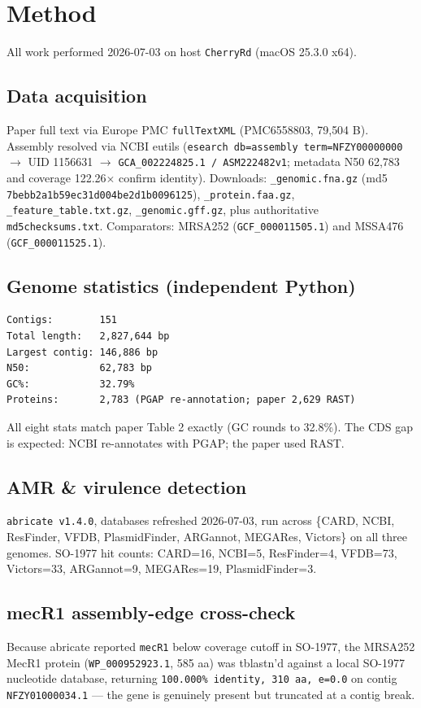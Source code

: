 \documentclass[11pt]{article}
\begin{document}
\section{Method}

All work performed 2026-07-03 on host \texttt{CherryRd} (macOS 25.3.0 x64).

\subsection{Data acquisition}
Paper full text via Europe PMC \texttt{fullTextXML} (PMC6558803, 79{,}504 B).
Assembly resolved via NCBI eutils (\texttt{esearch db=assembly term=NFZY00000000}
$\rightarrow$ UID 1156631 $\rightarrow$ \texttt{GCA\_002224825.1 / ASM222482v1};
metadata N50 62{,}783 and coverage 122.26$\times$ confirm identity). Downloads:
\texttt{\_genomic.fna.gz} (md5 \texttt{7bebb2a1b59ec31d004be2d1b0096125}),
\texttt{\_protein.faa.gz}, \texttt{\_feature\_table.txt.gz},
\texttt{\_genomic.gff.gz}, plus authoritative \texttt{md5checksums.txt}.
Comparators: MRSA252 (\texttt{GCF\_000011505.1}) and MSSA476 (\texttt{GCF\_000011525.1}).

\subsection{Genome statistics (independent Python)}
\begin{verbatim}
Contigs:        151
Total length:   2,827,644 bp
Largest contig: 146,886 bp
N50:            62,783 bp
GC%:            32.79%
Proteins:       2,783 (PGAP re-annotation; paper 2,629 RAST)
\end{verbatim}
All eight stats match paper Table 2 exactly (GC rounds to 32.8\%).
The CDS gap is expected: NCBI re-annotates with PGAP; the paper used RAST.

\subsection{AMR \& virulence detection}
\texttt{abricate v1.4.0}, databases refreshed 2026-07-03, run across
\{CARD, NCBI, ResFinder, VFDB, PlasmidFinder, ARGannot, MEGARes, Victors\}
on all three genomes. SO-1977 hit counts:
CARD=16, NCBI=5, ResFinder=4, VFDB=73, Victors=33, ARGannot=9, MEGARes=19,
PlasmidFinder=3.

\subsection{mecR1 assembly-edge cross-check}
Because abricate reported \texttt{mecR1} below coverage cutoff in SO-1977,
the MRSA252 MecR1 protein (\texttt{WP\_000952923.1}, 585 aa) was tblastn'd
against a local SO-1977 nucleotide database, returning
\texttt{100.000\% identity, 310 aa, e=0.0} on contig \texttt{NFZY01000034.1}
--- the gene is genuinely present but truncated at a contig break.
\end{document}
